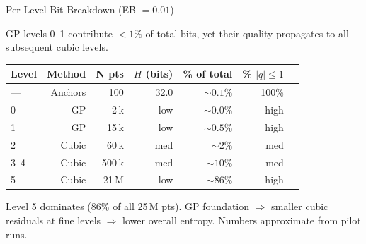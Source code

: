 \documentclass[aspectratio=169, 10pt]{beamer}
\begin{document}
\begin{frame}{Per-Level Bit Breakdown (EB $= 0.01$)}
\vspace{0.2em}

{\footnotesize GP levels 0--1 contribute $<1\%$ of total bits, yet their
quality propagates to all subsequent cubic levels.}

\smallskip
{\footnotesize
\begin{tabular}{lrrrrrr}
  \toprule
  Level & Method & N pts & $H$ (bits) & \% of total & \% $|q|{\le}1$ \\
  \midrule
  —    & Anchors   & 100   & 32.0 & ${\sim}0.1\%$ & 100\% \\
  0    & GP        & 2\,k  & low  & ${\sim}0.0\%$ & high  \\
  1    & GP        & 15\,k & low  & ${\sim}0.5\%$ & high  \\
  2    & Cubic     & 60\,k & med  & ${\sim}2\%$   & med   \\
  3--4 & Cubic     & 500\,k & med & ${\sim}10\%$  & med   \\
  5    & Cubic     & 21\,M & low  & ${\sim}86\%$  & high  \\
  \bottomrule
\end{tabular}
}

\smallskip
{\scriptsize\color{cmuted}
  Level 5 dominates (86\% of all 25\,M pts). GP foundation $\Rightarrow$
  smaller cubic residuals at fine levels $\Rightarrow$ lower overall entropy.
  Numbers approximate from pilot runs.}
\end{frame}
\end{document}

